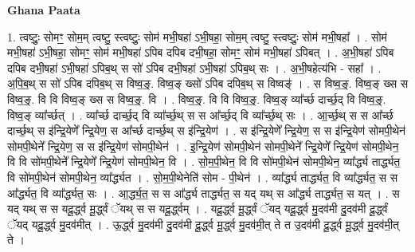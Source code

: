 \documentclass[17pt]{extarticle}
\begin{document}
\textbf{Ghana Paata } \newline

1. त्वष्टुः॒ सोमꣳ॒॒ सोम॒म् त्वष्टु॒ स्त्वष्टुः॒ सोम॑ मभी॒षहा॑ ऽभी॒षहा॒ सोम॒म् त्वष्टु॒ स्त्वष्टुः॒ सोम॑ मभी॒षहा᳚ । . सोम॑ मभी॒षहा॑ ऽभी॒षहा॒ सोमꣳ॒॒ सोम॑ मभी॒षहा॑ ऽपिब दपिब दभी॒षहा॒ सोमꣳ॒॒ सोम॑ मभी॒षहा॑ ऽपिबत् । . अ॒भी॒षहा॑ ऽपिब दपिब दभी॒षहा॑ ऽभी॒षहा॑ ऽपिब॒थ् स सो॑ ऽपिब दभी॒षहा॑ ऽभी॒षहा॑ ऽपिब॒थ् सः । . अ॒भी॒षहेत्य॑भि - सहा᳚ । . अ॒पि॒ब॒थ् स सो॑ ऽपिब दपिब॒थ् स विष्व॒ङ्॒. विष्व॒ङ् ख्सो॑ ऽपिब दपिब॒थ् स विष्वङ्॑ । . स विष्व॒ङ्॒. विष्व॒ङ् ख्स स विष्व॒ङ्॒. वि वि विष्व॒ङ् ख्स स विष्व॒ङ्॒. वि । . विष्व॒ङ्॒. वि वि विष्व॒ङ्॒. विष्व॒ङ् व्या᳚र्च्छ दार्च्छ॒द् वि विष्व॒ङ्॒. विष्व॒ङ् व्या᳚र्च्छत् । . व्या᳚र्च्छ दार्च्छ॒द् वि व्या᳚र्च्छ॒थ् स स आ᳚र्च्छ॒द् वि व्या᳚र्च्छ॒थ् सः । . आ॒र्च्छ॒थ् स स आ᳚र्च्छ दार्च्छ॒थ् स इ॑न्द्रि॒येणे᳚ न्द्रि॒येण॒ स आ᳚र्च्छ दार्च्छ॒थ् स इ॑न्द्रि॒येण॑ । . स इ॑न्द्रि॒येणे᳚ न्द्रि॒येण॒ स स इ॑न्द्रि॒येण॑ सोमपी॒थेन॑ सोमपी॒थेने᳚ न्द्रि॒येण॒ स स इ॑न्द्रि॒येण॑ सोमपी॒थेन॑ । . इ॒न्द्रि॒येण॑ सोमपी॒थेन॑ सोमपी॒थेने᳚ न्द्रि॒येणे᳚ न्द्रि॒येण॑ सोमपी॒थेन॒ वि वि सो॑मपी॒थेने᳚ न्द्रि॒येणे᳚ न्द्रि॒येण॑ सोमपी॒थेन॒ वि । . सो॒म॒पी॒थेन॒ वि वि सो॑मपी॒थेन॑ सोमपी॒थेन॒ व्या᳚र्द्ध्य तार्द्ध्यत॒ वि सो॑मपी॒थेन॑ सोमपी॒थेन॒ व्या᳚र्द्ध्यत । . सो॒म॒पी॒थेनेति॑ सोम - पी॒थेन॑ । . व्या᳚र्द्ध्य तार्द्ध्यत॒ वि व्या᳚र्द्ध्यत॒ स स आ᳚र्द्ध्यत॒ वि व्या᳚र्द्ध्यत॒ सः । . आ॒र्द्ध्य॒त॒ स स आ᳚र्द्ध्य तार्द्ध्यत॒ स यद् यथ् स आ᳚र्द्ध्य तार्द्ध्यत॒ स यत् । . स यद् यथ् स स यदू॒र्द्ध्व मू॒र्द्ध्वं ॅयथ् स स यदू॒र्द्ध्वम् । . यदू॒र्द्ध्व मू॒र्द्ध्वं ॅयद् यदू॒र्द्ध्व मु॒दव॑मी दु॒दव॑मी दू॒र्द्ध्वं ॅयद् यदू॒र्द्ध्व मु॒दव॑मीत् । . ऊ॒र्द्ध्व मु॒दव॑मी दु॒दव॑मी दू॒र्द्ध्व मू॒र्द्ध्व मु॒दव॑मी॒त् ते त उ॒दव॑मी दू॒र्द्ध्व मू॒र्द्ध्व मु॒दव॑मी॒त् ते । \newline
\end{document}
